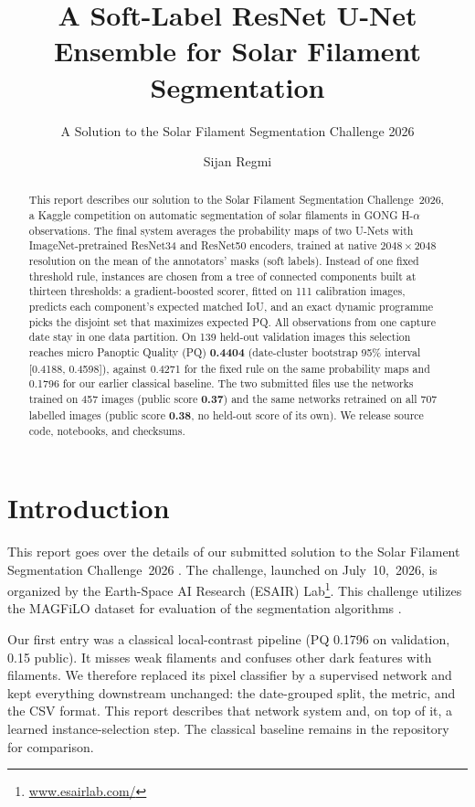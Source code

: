 \documentclass[sigconf]{acmart}
\begin{document}
\title{A Soft-Label ResNet U-Net Ensemble for Solar Filament Segmentation}
\subtitle{A Solution to the Solar Filament Segmentation Challenge 2026}
\author{Sijan Regmi}
\begin{abstract}
This report describes our solution to the Solar Filament Segmentation Challenge~2026, a Kaggle competition on automatic segmentation of solar filaments in GONG H-$\alpha$ observations. The final system averages the probability maps of two U-Nets with ImageNet-pretrained ResNet34 and ResNet50 encoders, trained at native $2048\times2048$ resolution on the mean of the annotators' masks (soft labels). Instead of one fixed threshold rule, instances are chosen from a tree of connected components built at thirteen thresholds: a gradient-boosted scorer, fitted on 111 calibration images, predicts each component's expected matched IoU, and an exact dynamic programme picks the disjoint set that maximizes expected PQ. All observations from one capture date stay in one data partition. On 139 held-out validation images this selection reaches micro Panoptic Quality (PQ) \textbf{0.4404} (date-cluster bootstrap 95\% interval [0.4188, 0.4598]), against 0.4271 for the fixed rule on the same probability maps and 0.1796 for our earlier classical baseline. The two submitted files use the networks trained on 457 images (public score \textbf{0.37}) and the same networks retrained on all 707 labelled images (public score \textbf{0.38}, no held-out score of its own). We release source code, notebooks, and checksums.
\end{abstract}
\maketitle
\section{Introduction}
This report goes over the details of our submitted solution to the Solar Filament Segmentation Challenge~2026 \cite{filament-segmentation-2026}. The challenge, launched on July~10,~2026, is organized by the Earth-Space AI Research (ESAIR) Lab\footnote{\href{https://www.esairlab.com/home}{www.esairlab.com/}}. This challenge utilizes the MAGFiLO dataset for evaluation of the segmentation algorithms \cite{ahmadzadeh2024dataset}.

Our first entry was a classical local-contrast pipeline (PQ 0.1796 on validation, 0.15 public). It misses weak filaments and confuses other dark features with filaments. We therefore replaced its pixel classifier by a supervised network and kept everything downstream unchanged: the date-grouped split, the metric, and the CSV format. This report describes that network system and, on top of it, a learned instance-selection step. The classical baseline remains in the repository for comparison.
\end{document}
